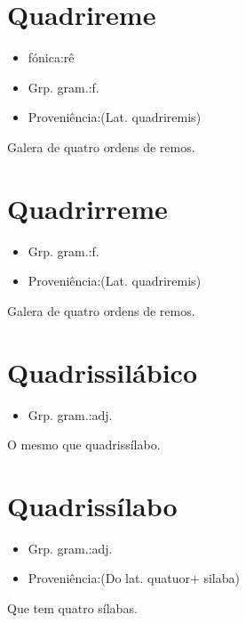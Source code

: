 \section{Quadrireme}
\begin{itemize}
\item {fónica:rê}
\end{itemize}
\begin{itemize}
\item {Grp. gram.:f.}
\end{itemize}
\begin{itemize}
\item {Proveniência:(Lat. \textunderscore quadriremis\textunderscore )}
\end{itemize}
Galera de quatro ordens de remos.
\section{Quadrirreme}
\begin{itemize}
\item {Grp. gram.:f.}
\end{itemize}
\begin{itemize}
\item {Proveniência:(Lat. \textunderscore quadriremis\textunderscore )}
\end{itemize}
Galera de quatro ordens de remos.
\section{Quadrissilábico}
\begin{itemize}
\item {Grp. gram.:adj.}
\end{itemize}
O mesmo que \textunderscore quadrissílabo\textunderscore .
\section{Quadrissílabo}
\begin{itemize}
\item {Grp. gram.:adj.}
\end{itemize}
\begin{itemize}
\item {Proveniência:(Do lat. \textunderscore quatuor\textunderscore  + \textunderscore silaba\textunderscore )}
\end{itemize}
Que tem quatro sílabas.
